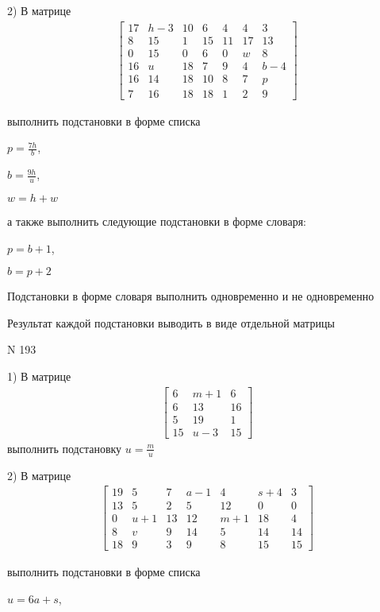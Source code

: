 \documentclass[11pt]{report}
\begin{document}
    2) В матрице
\begin{align*}
\left[\begin{matrix}17 & h - 3 & 10 & 6 & 4 & 4 & 3\\8 & 15 & 1 & 15 & 11 & 17 & 13\\0 & 15 & 0 & 6 & 0 & w & 8\\16 & u & 18 & 7 & 9 & 4 & b - 4\\16 & 14 & 18 & 10 & 8 & 7 & p\\7 & 16 & 18 & 18 & 1 & 2 & 9\end{matrix}\right]
\end{align*}

выполнить подстановки в форме списка

$p=\frac{7 h}{b}$,

$b=\frac{9 h}{u}$,

$w=h + w$

а также выполнить следующие подстановки в форме словаря:

$p=b + 1$,

$b=p + 2$


    Подстановки в форме словаря выполнить одновременно и не одновременно


    Результат каждой подстановки выводить в виде отдельной матрицы

\newpage
N 193


    1) В матрице
\begin{align*}
\left[\begin{matrix}6 & m + 1 & 6\\6 & 13 & 16\\5 & 19 & 1\\15 & u - 3 & 15\end{matrix}\right]
\end{align*}
выполнить подстановку $u=\frac{m}{u}$


    2) В матрице
\begin{align*}
\left[\begin{matrix}19 & 5 & 7 & a - 1 & 4 & s + 4 & 3\\13 & 5 & 2 & 5 & 12 & 0 & 0\\0 & u + 1 & 13 & 12 & m + 1 & 18 & 4\\8 & v & 9 & 14 & 5 & 14 & 14\\18 & 9 & 3 & 9 & 8 & 15 & 15\end{matrix}\right]
\end{align*}

выполнить подстановки в форме списка

$u=6 a + s$,
\end{document}

